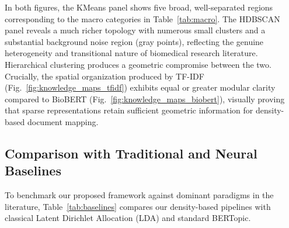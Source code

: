 \documentclass[a4paper,10pt,conference]{IEEEtran}
\begin{document}
In both figures, the KMeans panel shows five broad, well-separated regions corresponding to the macro categories in Table~\ref{tab:macro}. The HDBSCAN panel reveals a much richer topology with numerous small clusters and a substantial background noise region (gray points), reflecting the genuine heterogeneity and transitional nature of biomedical research literature. Hierarchical clustering produces a geometric compromise between the two. Crucially, the spatial organization produced by TF-IDF (Fig.~\ref{fig:knowledge_maps_tfidf}) exhibits equal or greater modular clarity compared to BioBERT (Fig.~\ref{fig:knowledge_maps_biobert}), visually proving that sparse representations retain sufficient geometric information for density-based document mapping.

\subsection{Comparison with Traditional and Neural Baselines}

To benchmark our proposed framework against dominant paradigms in the literature, Table~\ref{tab:baselines} compares our density-based pipelines with classical Latent Dirichlet Allocation (LDA) and standard BERTopic.

\begin{table}[t]
\centering
\caption{Topic modeling benchmark: comparison of classical LDA ($K=5, K=8$) and neural BERTopic against proposed density-based frameworks including automated word intrusion accuracy and topic purity.}
\label{tab:baselines}
\end{table}
\end{document}
